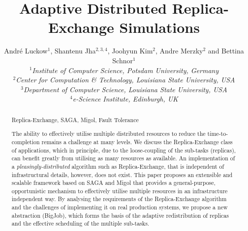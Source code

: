\documentclass{rspublic}
\title[Adaptive Distributed Replica-Exchange Simulations]{Adaptive Distributed
  Replica-Exchange Simulations}
\author[Luckow, Jha, Kim, Merzky, Schnor]{
  Andr\'e Luckow$^{1}$, Shantenu Jha$^{2,3,4}$, Joohyun Kim$^{2}$, Andre Merzky$^{2}$ and Bettina Schnor$^{1}$\\
  \small{\emph{$^{1}$Institute of Computer Science, Potsdam University, Germany}}\\
  \small{\emph{$^{2}$Center for Computation \& Technology, Louisiana State University, USA}}\\
  \small{\emph{$^{3}$Department of Computer Science, Louisiana State
      University, USA}}\\
  \small{\emph{$^{4}$e-Science Institute, Edinburgh, UK}}\\
}
\newcommand{\jhanote}[1]{ {\textcolor{red} { ***SJ: #1 }}}
\newcommand{\jhanote}[1]{}
\begin{document}
 


\maketitle    

\begin{abstract}{Replica-Exchange, SAGA, Migol, Fault Tolerance}  


  The ability to effectively utilise multiple distributed resources to
  reduce the time-to-completion remains a challenge at many levels.
  We discuss the Replica-Exchange class of applications, which in
  principle, due to the loose-coupling of the sub-tasks (replicas),
  can benefit greatly from utilising as many resources as available.
  An implementation of a {\it  pleasingly-distributed} algorithm such 
  as Replica-Exchange, that
  is independent of infrastructural details, however, does not exist.
  This paper proposes an extensible and scalable framework based on
  SAGA and Migol that provides a general-purpose, opportunistic
  mechanism to effectively utilise multiple resources in an
  infrastructure independent way. By analysing the requirements of the
  Replica-Exchange algorithm and the challenges of implementing it on
  real production systems, we propose a new abstraction (BigJob),
  which forms the basis of the adaptive redistribution of replicas and
  the effective scheduling of the multiple sub-tasks.
  




\end{abstract}
\end{document}
